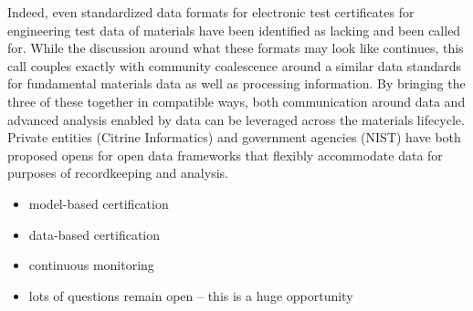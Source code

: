 Indeed, even standardized data formats for electronic test certificates for engineering test data of materials have been identified as lacking and been called for\cite{Gagliardi2015357}. While the discussion around what these formats may look like continues, this call couples exactly with community coalescence around a similar data standards for fundamental materials data as well as processing information. By bringing the three of these together in compatible ways, both communication around data and advanced analysis enabled by data can be leveraged across the materials lifecycle. Private entities (Citrine Informatics) and government agencies (NIST) have both proposed opens for open data frameworks that flexibly accommodate data for purposes of recordkeeping and analysis\cite{Citrination,TheMineralsMetals&MaterialsSocietyTMS2015}.

\begin{itemize}
\item model-based certification
\item data-based certification
\item continuous monitoring
\item lots of questions remain open -- this is a huge opportunity
\end{itemize}
